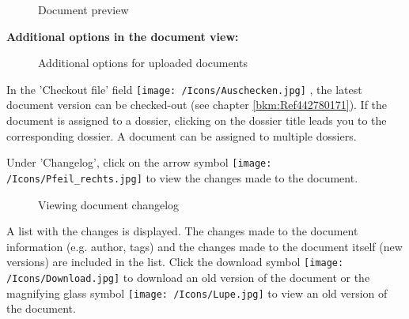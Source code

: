 \begin{figure}[H]
\caption{Document preview}
\end{figure}

\textbf{Additional options in the document view:}

\begin{figure}[H]
\caption{Additional options for uploaded documents}
\end{figure}

In the 'Checkout file' field \texttt{[image: /Icons/Auschecken.jpg]} , the latest document version can be checked-out (see chapter \ref{bkm:Ref442780171}). If the document is assigned to a dossier, clicking on the dossier title  leads you to the corresponding dossier. A document can be assigned to multiple dossiers. \newline 

\vspace{\baselineskip}

Under 'Changelog', click on the arrow symbol \texttt{[image: /Icons/Pfeil\_rechts.jpg]}  to view the changes made to the document.

\begin{figure}[H]
\caption{Viewing document changelog}
\end{figure}

A list with the changes is displayed. The changes made to the document information (e.g. author, tags) and the changes made to the document itself (new versions) are included in the list. Click the download symbol \texttt{[image: /Icons/Download.jpg]}  to download an old version of the document or the magnifying glass symbol \texttt{[image: /Icons/Lupe.jpg]}  to view an old version of the document. \newline

